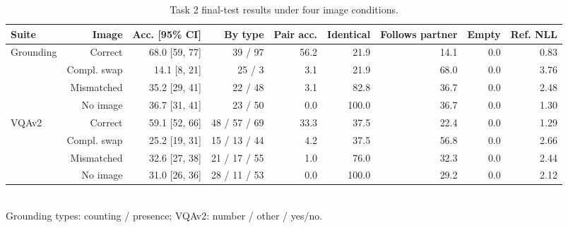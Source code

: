 \begin{table}[t]
\centering
\scriptsize
\begin{tabular}{lrrrrrrrr}
\toprule
Suite & Image & Acc. [95\% CI] & By type & Pair acc. & Identical & Follows partner & Empty & Ref. NLL \\
\midrule
Grounding & Correct & 68.0 [59, 77] & 39 / 97 & 56.2 & 21.9 & 14.1 & 0.0 & 0.83 \\
 & Compl. swap & 14.1 [8, 21] & 25 / 3 & 3.1 & 21.9 & 68.0 & 0.0 & 3.76 \\
 & Mismatched & 35.2 [29, 41] & 22 / 48 & 3.1 & 82.8 & 36.7 & 0.0 & 2.48 \\
 & No image & 36.7 [31, 41] & 23 / 50 & 0.0 & 100.0 & 36.7 & 0.0 & 1.30 \\
\midrule
VQAv2 & Correct & 59.1 [52, 66] & 48 / 57 / 69 & 33.3 & 37.5 & 22.4 & 0.0 & 1.29 \\
 & Compl. swap & 25.2 [19, 31] & 15 / 13 / 44 & 4.2 & 37.5 & 56.8 & 0.0 & 2.66 \\
 & Mismatched & 32.6 [27, 38] & 21 / 17 / 55 & 1.0 & 76.0 & 32.3 & 0.0 & 2.44 \\
 & No image & 31.0 [26, 36] & 28 / 11 / 53 & 0.0 & 100.0 & 29.2 & 0.0 & 2.12 \\
\bottomrule
\end{tabular}
\\[2pt]{\footnotesize Grounding types: counting / presence; VQAv2: number / other / yes/no.}
\caption{Task 2 final-test results under four image conditions.}
\label{tab:t2-final}
\end{table}
